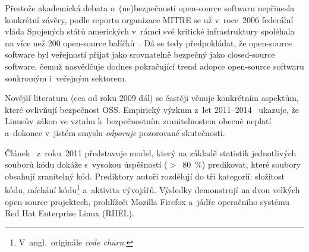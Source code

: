 Přestože akademická debata o~(ne)bezpečnosti open-source softwaru nepřinesla konkrétní závěry, podle reportu organizace MITRE se už v~roce~2006 federální vláda Spojených států amerických v~rámci své kritické infrastruktury spoléhala na více než 200 open-source balíčků~\cite{dhsbacksoss}. Dá se tedy předpokládat, že open-source software byl veřejností přijat jako srovnatelně bezpečný jako closed-source software, čemuž nasvědčuje dodnes pokračující trend adopce open-source softwaru soukromým i~veřejným sektorem.

Novější literatura (cca od roku 2009 dál) se častěji věnuje konkrétním aspektům, které ovlivňují bezpečnost OSS. Empirický výzkum z~let 2011--2014~\cite{oss2011, osslinuslaw2014} ukazuje, že Linusův zákon ve vztahu k~bezpečnostním zranitelnostem obecně neplatí a~dokonce v~jistém smyslu \emph{odporuje} pozorované skutečnosti.

Článek~\cite{oss2011} z~roku~2011 představuje model, který na základě statistik jednotlivých souborů kódu dokáže s~vysokou úspěšností ($>$~80~\%) predikovat, které soubory obsahují zranitelný kód. Prediktory autoři rozdělují do tří kategorií: složitost kódu, míchání kódu\footnote{V~angl.\ originále \emph{code churn}.} a~aktivita vývojářů. Výsledky demonstrují na dvou velkých open-source projektech, prohlížeči Mozilla Firefox a~jádře operačního systému Red Hat Enterprise Linux (RHEL).

